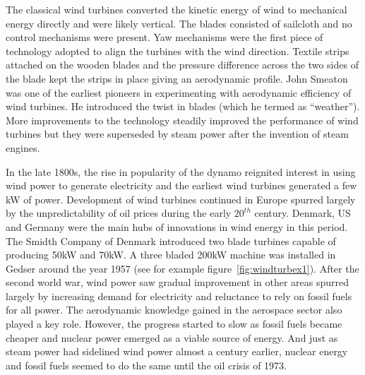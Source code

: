 The classical wind turbines converted the kinetic energy of wind to mechanical energy directly and were likely vertical. The blades consisted of sailcloth and no control mechanisms were present. Yaw mechanisms were the first piece of technology adopted to align the turbines with the wind direction. Textile strips attached on the wooden blades and the pressure difference across the two sides of the blade kept the strips in place giving an aerodynamic profile. John Smeaton was one of the earliest pioneers in experimenting with aerodynamic efficiency of wind turbines. He introduced the twist in blades (which he termed as “weather”). More improvements to the technology steadily improved the performance of wind turbines but they were superseded by steam power after the invention of steam engines.

In the late 1800s, the rise in popularity of the dynamo reignited interest in using wind power to generate electricity and the earliest wind turbines generated a few kW of power. Development of wind turbines continued in Europe spurred largely by the unpredictability of oil prices during the early $20^{th}$ century. Denmark, US and Germany were the main hubs of innovations in wind energy in this period. The Smidth Company of Denmark introduced two blade turbines capable of producing 50kW and 70kW. A three bladed 200kW machine was installed in Gedser around the year 1957 (see for example figure~\ref{fig:windturbex1}). After the second world war, wind power saw gradual improvement in other areas spurred largely by increasing demand for electricity and reluctance to rely on fossil fuels for all power. The aerodynamic knowledge gained in the aerospace sector also played a key role. However, the progress started to slow as fossil fuels became cheaper and nuclear power emerged as a viable source of energy. And just as steam power had sidelined wind power almost a century earlier, nuclear energy and fossil fuels seemed to do the same until the oil crisis of 1973. 

